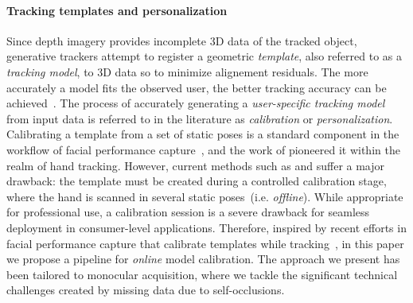 \paragraph{Tracking templates and personalization}
Since depth imagery provides incomplete 3D data of the tracked object, generative trackers attempt to register a geometric \emph{template}, also referred to as a \emph{tracking model}, to 3D data so to minimize alignement residuals.
The more accurately a model fits the observed user, the better tracking accuracy can be achieved~\cite{tkach2016sphere,taylor2016joint}. The process of accurately generating a \emph{user-specific tracking model} from input data is referred to in the literature as \emph{calibration} or \emph{personalization}. 
Calibrating a template from a set of static poses is a standard component in the workflow of facial performance capture~\cite{weise2011realtime,cao2015facial}, and the work of   pioneered it within the realm of hand tracking. However, current methods such as \cite{taylor2016joint} and \cite{tkach2016sphere} suffer a major drawback: the template must be created during a controlled calibration stage, where the hand is scanned in several static poses~(i.e. \emph{offline}). While appropriate for professional use, a calibration session is a severe drawback for seamless deployment in consumer-level applications.
Therefore, inspired by recent efforts in facial performance capture that calibrate templates while tracking~\cite{li_sig13,bouaziz2013online}, in this paper we propose a pipeline for \emph{online} model calibration. 
The approach we present has been tailored to monocular acquisition, where we tackle the significant technical challenges created by missing data due to self-occlusions.

